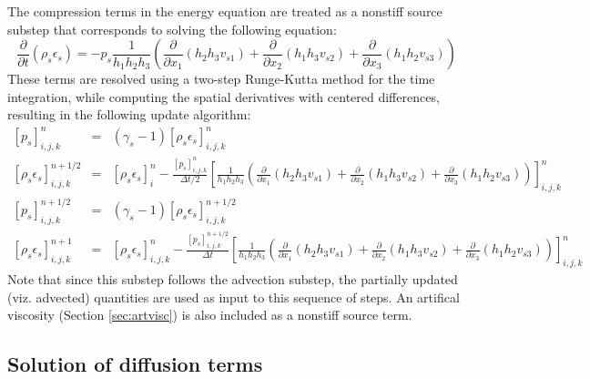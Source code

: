 \documentclass[11pt,letterpaper]{article}
\begin{document}
The compression terms in the energy equation are treated as a nonstiff source substep that corresponds to solving the following equation:
\begin{equation}
\frac{\partial}{\partial t} \left( \rho_s \epsilon_s \right) = -p_s \frac{1}{h_1 h_2 h_3} \left( \frac{\partial}{\partial x_1} \left( h_2 h_3 v_{s1} \right) + \frac{\partial}{\partial x_2} \left( h_1 h_3 v_{s2} \right) + \frac{\partial}{\partial x_3} \left( h_1 h_2 v_{s3} \right) \right)
\end{equation}
These terms are resolved using a two-step Runge-Kutta method for the time integration, while computing the spatial derivatives with centered differences, resulting in the following update algorithm:
\begin{eqnarray}
\left[p_s \right]_{i,j,k}^{n} &=& \left( \gamma_s - 1 \right) \left[ \rho_s \epsilon_s \right]_{i,j,k}^{n} \nonumber \\
\left[ \rho_s \epsilon_s \right]_{i,j,k}^{n+1/2} &=& \left[ \rho_s \epsilon_s \right]_i^{n} - \frac{ \left[ p_s \right]_{i,j,k}^n }{\Delta t / 2} \left[ \frac{1}{h_1 h_2 h_3} \left( \frac{\partial}{\partial x_1} \left( h_2 h_3 v_{s1} \right) + \frac{\partial}{\partial x_2} \left( h_1 h_3 v_{s2} \right) + \frac{\partial}{\partial x_3} \left( h_1 h_2 v_{s3} \right) \right) \right]_{i,j,k}^n \nonumber \\
\left[ p_s \right]_{i,j,k}^{n+1/2} &=& \left( \gamma_s - 1 \right) \left[ \rho_s \epsilon_s \right]_{i,j,k}^{n+1/2} \nonumber \\
\left[ \rho_s \epsilon_s \right]_{i,j,k}^{n+1} &=& \left[ \rho_s \epsilon_s \right]_{i,j,k}^{n} - \frac{ \left[ p_s \right]_{i,j,k}^{n+1/2} }{\Delta t} \left[ \frac{1}{h_1 h_2 h_3} \left( \frac{\partial}{\partial x_1} \left( h_2 h_3 v_{s1} \right) + \frac{\partial}{\partial x_2} \left( h_1 h_3 v_{s2} \right) + \frac{\partial}{\partial x_3} \left( h_1 h_2 v_{s3} \right) \right) \right]_{i,j,k}^n \nonumber
\end{eqnarray}
Note that since this substep follows the advection substep, the partially updated (viz. advected) quantities are used as input to this sequence of steps.  An artifical viscosity (Section \ref{sec:artvisc}) is also included as a nonstiff source term.  


\subsection{Solution of diffusion terms}
\end{document}
